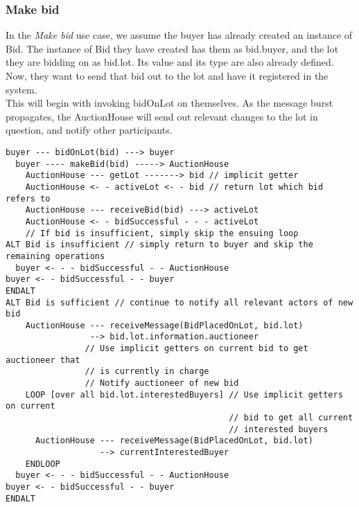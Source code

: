 \documentclass[titlepage, 12pt]{extarticle}
\begin{document}
\subsubsection{Make bid}
In the {\it Make bid} use case, we assume the buyer has already created an instance of Bid. The instance of Bid they have created has them as bid.buyer, and the lot they are bidding on as bid.lot. Its value and its type are also already defined.\\
Now, they want to send that bid out to the lot and have it registered in the system.\\
This will begin with invoking bidOnLot on themselves. As the message burst propagates, the AuctionHouse will send out relevant changes to the lot in question, and notify other participants.
\begin{verbatim}
buyer --- bidOnLot(bid) ---> buyer
  buyer ---- makeBid(bid) -----> AuctionHouse
    AuctionHouse --- getLot -------> bid // implicit getter
    AuctionHouse <- - activeLot <- - bid // return lot which bid refers to
    AuctionHouse --- receiveBid(bid) ---> activeLot
    AuctionHouse <- - bidSuccessful - - - activeLot 
    // If bid is insufficient, simply skip the ensuing loop
ALT Bid is insufficient // simply return to buyer and skip the remaining operations
  buyer <- - - bidSuccessful - - AuctionHouse
buyer <- - bidSuccessful - - buyer
ENDALT
ALT Bid is sufficient // continue to notify all relevant actors of new bid
    AuctionHouse --- receiveMessage(BidPlacedOnLot, bid.lot) 
                 --> bid.lot.information.auctioneer 
                // Use implicit getters on current bid to get auctioneer that
                // is currently in charge
                // Notify auctioneer of new bid
    LOOP [over all bid.lot.interestedBuyers] // Use implicit getters on current
                                             // bid to get all current
                                             // interested buyers
      AuctionHouse --- receiveMessage(BidPlacedOnLot, bid.lot) 
                   --> currentInterestedBuyer
    ENDLOOP
  buyer <- - - bidSuccessful - - AuctionHouse
buyer <- - bidSuccessful - - buyer
ENDALT
\end{verbatim}



\end{document}
